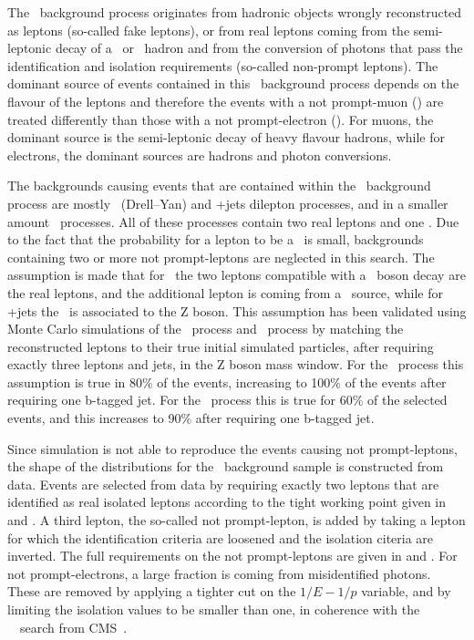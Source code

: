 The \NPL\ background process originates from hadronic objects wrongly reconstructed as leptons (so-called fake leptons), or from real leptons coming from the semi-leptonic decay of a \Pbottom\ or \Pcharm\ hadron and from the conversion of photons that pass the identification and isolation requirements (so-called non-prompt leptons). The dominant source of events contained in this \NPL\ background process depends on the flavour of the leptons and therefore the events with a not prompt-muon (\NPM) are treated differently than those with a not prompt-electron (\NPE). For muons, the dominant source is the semi-leptonic decay of heavy flavour hadrons, while for electrons, the dominant sources are hadrons and photon conversions. 

The backgrounds causing events that are contained within the \NPL\ background process are mostly \DY\ (Drell--Yan) and \ttbar+jets dilepton processes, and in a smaller amount \WW\ processes. All of these processes contain two real leptons and one \NPL. Due to the fact that the probability for a lepton to be a \NPL\ is small, backgrounds containing two or more  not prompt-leptons are neglected in this search. The assumption is made that for \DY\ the two leptons compatible with a \PZ\ boson decay are the real leptons, and the additional lepton is coming from a \NPL\ source, while for \ttbar+jets the \NPL\ is associated to the Z boson. This assumption has been validated using Monte Carlo simulations of the \DY\ process and \ttbar\ process by matching the reconstructed leptons to their true initial simulated particles, after requiring exactly three leptons and jets, in the Z boson mass window. For the \DY\ process this assumption is true in 80\% of the events, increasing to 100\% of the events after requiring one b-tagged jet. For the \ttbar\ process this is true for 60\% of the selected events, and this increases to 90\% after requiring one b-tagged jet.

Since simulation is not able to reproduce the events causing not prompt-leptons, the shape of the distributions for the \NPL\ background sample is constructed from data. Events are selected from data by requiring exactly  two leptons that are identified as real isolated leptons according to the tight working point given in  and . A third lepton, the so-called not prompt-lepton,  is added by taking a lepton for which the identification criteria are loosened and the isolation citeria are inverted. The full  requirements on the not prompt-leptons are given in  and . For not prompt-electrons, a large fraction is coming from misidentified photons. These are removed by applying a tighter cut on the $1/E-1/p$ variable, and by limiting the isolation values to be smaller than one, in coherence with the \SM\ \tZq\ search from CMS~\cite{CMS-PAS-TOP-16-020}. 

